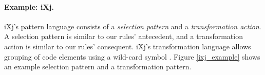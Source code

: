 \begin{figure}
\centering
{}
\caption{}
\label{fig:txl}
\end{figure}

\paragraph{\textbf{Example: iXj.}} 
iXj's pattern language consists of a {\em selection pattern} and a {\em transformation action}. A selection pattern is similar to our rules' antecedent, and a transformation action is similar to our rules' consequent. iXj's transformation language allows grouping of code elements using a wild-card symbol \codefont{*}. Figure \ref{ixj_example} shows an example selection pattern and a transformation pattern. 

